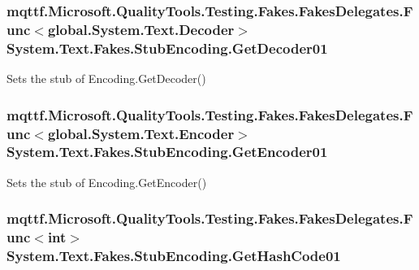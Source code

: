 \hypertarget{class_system_1_1_text_1_1_fakes_1_1_stub_encoding_a9ac4b003f84ff8ed0cb341441bb1a367}{
\subsubsection[{Get\-Decoder01}]{\setlength{\rightskip}{0pt plus 5cm}mqttf.\-Microsoft.\-Quality\-Tools.\-Testing.\-Fakes.\-Fakes\-Delegates.\-Func$<$global.\-System.\-Text.\-Decoder$>$ System.\-Text.\-Fakes.\-Stub\-Encoding.\-Get\-Decoder01}}\label{class_system_1_1_text_1_1_fakes_1_1_stub_encoding_a9ac4b003f84ff8ed0cb341441bb1a367}


Sets the stub of Encoding.\-Get\-Decoder()

\hypertarget{class_system_1_1_text_1_1_fakes_1_1_stub_encoding_ab2faf1b17b03875f3a8359771472e889}{
\subsubsection[{Get\-Encoder01}]{\setlength{\rightskip}{0pt plus 5cm}mqttf.\-Microsoft.\-Quality\-Tools.\-Testing.\-Fakes.\-Fakes\-Delegates.\-Func$<$global.\-System.\-Text.\-Encoder$>$ System.\-Text.\-Fakes.\-Stub\-Encoding.\-Get\-Encoder01}}\label{class_system_1_1_text_1_1_fakes_1_1_stub_encoding_ab2faf1b17b03875f3a8359771472e889}


Sets the stub of Encoding.\-Get\-Encoder()

\hypertarget{class_system_1_1_text_1_1_fakes_1_1_stub_encoding_ae16fc2ec75b3501a6ff135b9a403fe43}{
\subsubsection[{Get\-Hash\-Code01}]{\setlength{\rightskip}{0pt plus 5cm}mqttf.\-Microsoft.\-Quality\-Tools.\-Testing.\-Fakes.\-Fakes\-Delegates.\-Func$<$int$>$ System.\-Text.\-Fakes.\-Stub\-Encoding.\-Get\-Hash\-Code01}}\label{class_system_1_1_text_1_1_fakes_1_1_stub_encoding_ae16fc2ec75b3501a6ff135b9a403fe43}


